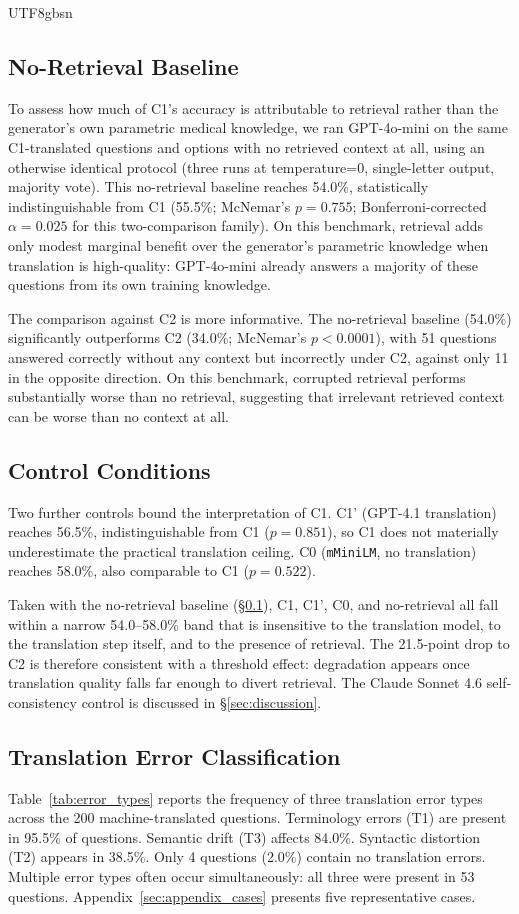 \documentclass[11pt]{article}
\begin{document}
\begin{CJK}{UTF8}{gbsn}
\subsection{No-Retrieval Baseline}
\label{sec:norag}
To assess how much of C1's accuracy is attributable to retrieval rather than the generator's own parametric medical knowledge, we ran GPT-4o-mini on the same C1-translated questions and options with no retrieved context at all, using an otherwise identical protocol (three runs at temperature=0, single-letter output, majority vote). This no-retrieval baseline reaches 54.0\%, statistically indistinguishable from C1 (55.5\%; McNemar's $p = 0.755$; Bonferroni-corrected $\alpha = 0.025$ for this two-comparison family). On this benchmark, retrieval adds only modest marginal benefit over the generator’s parametric knowledge when translation is high-quality: GPT-4o-mini already answers a majority of these questions from its own training knowledge.

The comparison against C2 is more informative. The no-retrieval baseline (54.0\%) significantly outperforms C2 (34.0\%; McNemar's $p < 0.0001$), with 51 questions answered correctly without any context but incorrectly under C2, against only 11 in the opposite direction. On this benchmark, corrupted retrieval performs substantially worse than no retrieval, suggesting that irrelevant retrieved context can be worse than no context at all.

\subsection{Control Conditions}
\label{sec:controls}
Two further controls bound the interpretation of C1. C1' (GPT-4.1
translation) reaches 56.5\%, indistinguishable from C1 ($p = 0.851$),
so C1 does not materially underestimate the practical translation
ceiling. C0 (\texttt{mMiniLM}, no translation) reaches 58.0\%, also
comparable to C1 ($p = 0.522$).

Taken with the no-retrieval baseline (\S\ref{sec:norag}), C1, C1', C0,
and no-retrieval all fall within a narrow 54.0--58.0\% band that is
insensitive to the translation model, to the translation step itself,
and to the presence of retrieval. The 21.5-point drop to C2 is therefore consistent with a threshold effect: degradation appears once translation quality falls far enough to divert retrieval. The Claude Sonnet 4.6 self-consistency control is discussed in \S\ref{sec:discussion}.

\subsection{Translation Error Classification}
Table~\ref{tab:error_types} reports the frequency of three translation error types across the 200 machine-translated questions. Terminology errors (T1) are present in 95.5\% of questions. Semantic drift (T3) affects 84.0\%. Syntactic distortion (T2) appears in 38.5\%. Only 4 questions (2.0\%) contain no translation errors. Multiple error types often occur simultaneously: all three were present in 53 questions. Appendix~\ref{sec:appendix_cases} presents five representative cases.


\end{CJK}
\end{document}
